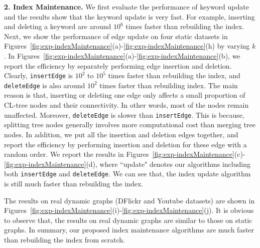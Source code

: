 {\color{blue}
\textbf{2. Index Maintenance.}
We first evaluate the performance of keyword update and the results show that the keyword update is very fast. For example, inserting and deleting a keyword are around $10^6$ times faster than rebuilding the index.
Next, we show the performance of edge update on four static datasets in Figures~\ref{fig:exp-indexMaintenance}(a)-\ref{fig:exp-indexMaintenance}(h) by varying $k$.
In Figures~\ref{fig:exp-indexMaintenance}(a)-\ref{fig:exp-indexMaintenance}(b), we report the efficiency by separately performing edge insertion and deletion. Clearly, {\tt insertEdge} is $10^2$ to $10^5$ times faster than rebuilding the index,
and {\tt deleteEdge} is also around $10^2$ times faster than rebuilding index.
The main reason is that, inserting or deleting one edge only affects a small proportion of CL-tree nodes and their connectivity.
In other words, most of the nodes remain unaffected.
Moreover, {\tt deleteEdge} is slower than {\tt insertEdge}. This is because, splitting tree nodes generally involves more computational cost than merging tree nodes.
In addition, we put all the insertion and deletion edges together, and report the efficiency by performing insertion and deletion for these edge with a random order. We report the results in Figures~\ref{fig:exp-indexMaintenance}(c)-\ref{fig:exp-indexMaintenance}(d),
where ``update" denotes our algorithms including both {\tt insertEdge} and {\tt deleteEdge}.
We can see that, the index update algorithm is still much faster than rebuilding the index.

The results on real dynamic graphs (DFlickr and Youtube datasets) are shown in Figures~\ref{fig:exp-indexMaintenance}(i)-\ref{fig:exp-indexMaintenance}(j).
It is obvious to observe that, the results on real dynamic graphs are similar to those on static graphs.
In summary, our proposed index maintenance algorithms are much faster than rebuilding the index from scratch.

}

